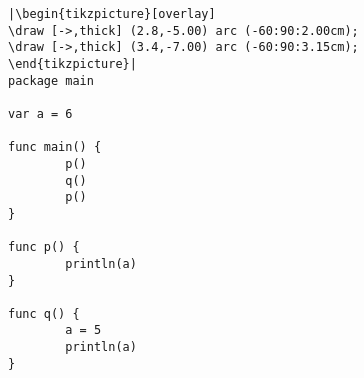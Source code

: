 \begin{lstlisting}[linewidth=.5\textwidth,caption=Global scope,label=src:scope2]
|\begin{tikzpicture}[overlay]
\draw [->,thick] (2.8,-5.00) arc (-60:90:2.00cm);
\draw [->,thick] (3.4,-7.00) arc (-60:90:3.15cm);
\end{tikzpicture}|
package main

var a = 6

func main() {
        p()
        q()
        p()
}

func p() {
        println(a)
}

func q() {
        a = 5
        println(a)
}
\end{lstlisting}
